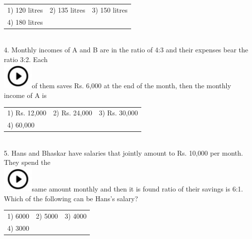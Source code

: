 \documentclass{article}
\begin{document}
\noindent \begin{tabular}{p{1.7in} p{1.6in} p{1.6in}} \\ 
 1) 120 litres            &  2) 135 litres     &  3) 150 litres      \\
4) 180 litres \\
\end{tabular}

\noindent  \\  

4.   Monthly incomes of A and B are in the ratio of 4:3 and their expenses bear the ratio 3:2. Each  
	\noindent \\ \includegraphics*[width=0.60in, height=0.52in]{images/image1}of them saves Rs. 6,000 at the end of the month, then the monthly income of A is

\noindent \begin{tabular}{p{1.7in} p{1.6in} p{1.6in}} \\ 
 1) Rs. 12,000          &  2) Rs. 24,000    &  3) Rs. 30,000    \\
4)  60,000 \\
\end{tabular}

\noindent \\  
5.   Hans and Bhaskar have salaries that jointly amount to Rs. 10,000 per month. They spend the  
	\noindent \\ \includegraphics*[width=0.60in, height=0.52in]{images/image1}same  amount  monthly and  then it  is found ratio  of  their  savings  is 6:1.  Which  of the  following can be Hans's salary?

\noindent 

\noindent \begin{tabular}{p{1.7in} p{1.6in} p{1.6in}} \\ 
 1) 6000                    &  2) 5000             &  3) 4000             \\
4) 3000 \\
\end{tabular}

\noindent 

\noindent  \\  
\end{document}
